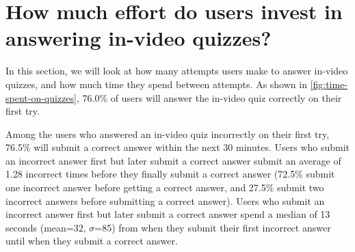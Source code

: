 \documentclass{sigchi}
\begin{document}




\section{How much effort do users invest in answering in-video quizzes?}

In this section, we will look at how many attempts users make to answer in-video quizzes, and how much time they spend between attempts. As shown in \autoref{fig:time-spent-on-quizzes}, 76.0\% of users will answer the in-video quiz correctly on their first try.



Among the users who answered an in-video quiz incorrectly on their first try, 76.5\% will submit a correct answer within the next 30 minutes. Users who submit an incorrect answer first but later submit a correct answer submit an average of 1.28 incorrect times before they finally submit a correct answer (72.5\% submit one incorrect answer before getting a correct answer, and 27.5\% submit two incorrect answers before submitting a correct answer). Users who submit an incorrect answer first but later submit a correct answer spend a median of 13 seconds (mean=32, $\sigma$=85) from when they submit their first incorrect answer until when they submit a correct answer.
\end{document}
